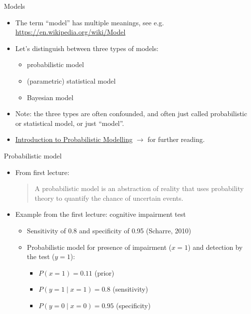 \documentclass{beamer}
\begin{document}
\begin{frame}{Models}
\begin{itemize}
  \item The term “model” has multiple meanings, see e.g. \url{https://en.wikipedia.org/wiki/Model}
  \item Let's distinguish between three types of models:
  \begin{itemize}
    \item probabilistic model
    \item (parametric) statistical model
    \item Bayesian model
    \end{itemize}
  \item Note: the three types are often confounded, and often just called probabilistic or statistical model, or just “model”.
  \item \href{https://opencourse.inf.ed.ac.uk/sites/default/files/https/opencourse.inf.ed.ac.uk/pmr/2023/probabilistic-modelling-primer.pdf}{Introduction to Probabilistic Modelling} $\rightarrow$ for further reading.

\end{itemize}
\end{frame}

\begin{frame}{Probabilistic model}
\begin{itemize}
\item From first lecture:
  \begin{quote}
    \vspace{0.4cm}
    A probabilistic model is an abstraction of reality that uses probability theory to quantify the chance of uncertain events.
  \end{quote}
  \vspace{0.2cm}
  \item Example from the first lecture: cognitive impairment test
  \begin{itemize}
    \item Sensitivity of 0.8 and specificity of 0.95 (Scharre, 2010)
    \item Probabilistic model for presence of impairment ($x = 1$) and detection by the test ($y = 1$):
    \begin{itemize}
      \item $P(x = 1) = 0.11$ (prior)
      \item $P(y = 1 \mid x = 1) = 0.8$ (sensitivity)
      \item $P(y = 0 \mid x = 0) = 0.95$ (specificity)
    \end{itemize}
  \end{itemize}
\end{itemize}
\end{frame}
\end{document}
